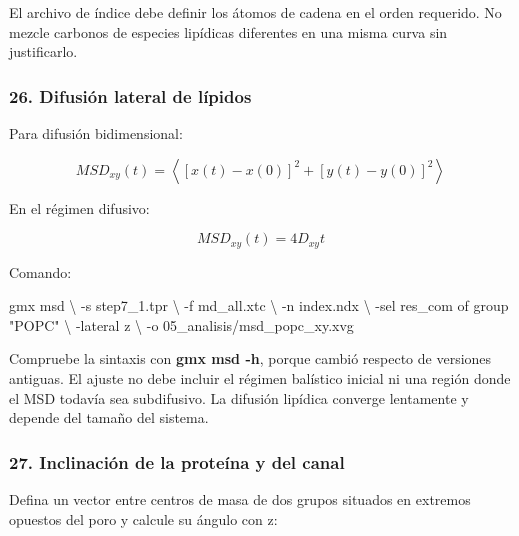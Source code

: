 \documentclass[
  spanish,
  11pt,
  a4paper]{article}
\newenvironment{Shaded}{\begin{snugshade}}{\end{snugshade}}
\newcommand{\AttributeTok}[1]{\textcolor[rgb]{0.13,0.29,0.53}{#1}}
\newcommand{\DataTypeTok}[1]{\textcolor[rgb]{0.13,0.29,0.53}{#1}}
\newcommand{\ExtensionTok}[1]{#1}
\newcommand{\NormalTok}[1]{#1}
\newcommand{\StringTok}[1]{\textcolor[rgb]{0.31,0.60,0.02}{#1}}
\begin{document}
El archivo de índice debe definir los átomos de cadena en el orden
requerido. No mezcle carbonos de especies lipídicas diferentes en una
misma curva sin justificarlo.

\subsubsection{26. Difusión lateral de
lípidos}\label{difusiuxf3n-lateral-de-luxedpidos}

Para difusión bidimensional:

\[
MSD_{xy}(t)=
\left\langle
[x(t)-x(0)]^2+[y(t)-y(0)]^2
\right\rangle
\]

En el régimen difusivo:

\[
MSD_{xy}(t)=4D_{xy}t
\]

Comando:

\begin{Shaded}
\begin{Highlighting}[]
\ExtensionTok{gmx}\NormalTok{ msd }\DataTypeTok{\textbackslash{}}
    \AttributeTok{{-}s}\NormalTok{ step7\_1.tpr }\DataTypeTok{\textbackslash{}}
    \AttributeTok{{-}f}\NormalTok{ md\_all.xtc }\DataTypeTok{\textbackslash{}}
    \AttributeTok{{-}n}\NormalTok{ index.ndx }\DataTypeTok{\textbackslash{}}
    \AttributeTok{{-}sel} \StringTok{\textquotesingle{}res\_com of group "POPC"\textquotesingle{}} \DataTypeTok{\textbackslash{}}
    \AttributeTok{{-}lateral}\NormalTok{ z }\DataTypeTok{\textbackslash{}}
    \AttributeTok{{-}o}\NormalTok{ 05\_analisis/msd\_popc\_xy.xvg}
\end{Highlighting}
\end{Shaded}

Compruebe la sintaxis con \textbf{gmx msd -h}, porque cambió respecto de
versiones antiguas. El ajuste no debe incluir el régimen balístico
inicial ni una región donde el MSD todavía sea subdifusivo. La difusión
lipídica converge lentamente y depende del tamaño del sistema.

\subsubsection{27. Inclinación de la proteína y del
canal}\label{inclinaciuxf3n-de-la-proteuxedna-y-del-canal}

Defina un vector entre centros de masa de dos grupos situados en
extremos opuestos del poro y calcule su ángulo con z:
\end{document}
